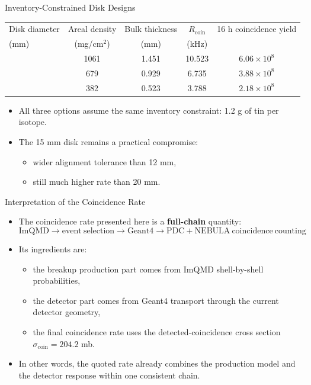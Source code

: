 \documentclass[aspectratio=169]{beamer}
\begin{document}
\begin{frame}{Inventory-Constrained Disk Designs}
\small
\centering
\begin{tabular}{>{\raggedright\arraybackslash}p{1.8cm}cccc}
\toprule
Disk diameter & Areal density & Bulk thickness & $R_{\mathrm{coin}}$ & 16 h coincidence yield \\
(mm) & (mg/cm$^2$) & (mm) & (kHz) &  \\
\midrule
12 & 1061 & 1.451 & 10.523 & $6.06\times 10^8$ \\
15 & 679 & 0.929 & 6.735 & $3.88\times 10^8$ \\
20 & 382 & 0.523 & 3.788 & $2.18\times 10^8$ \\
\bottomrule
\end{tabular}

\vspace{0.3cm}
\begin{itemize}
  \item All three options assume the same inventory constraint: 1.2 g of tin per isotope.
  \item The 15 mm disk remains a practical compromise:
  \begin{itemize}
    \item wider alignment tolerance than 12 mm,
    \item still much higher rate than 20 mm.
  \end{itemize}
\end{itemize}
\end{frame}

\begin{frame}{Interpretation of the Coincidence Rate}
\small
\begin{itemize}
  \item The coincidence rate presented here is a \textbf{full-chain} quantity:
  \[
  \mathrm{ImQMD} \rightarrow \mathrm{event~selection} \rightarrow \mathrm{Geant4} \rightarrow \mathrm{PDC+NEBULA~coincidence~counting}
  \]
  \item Its ingredients are:
  \begin{itemize}
    \item the breakup production part comes from ImQMD shell-by-shell probabilities,
    \item the detector part comes from Geant4 transport through the current detector geometry,
    \item the final coincidence rate uses the detected-coincidence cross section $\sigma_{\mathrm{coin}} = 204.2$ mb.
  \end{itemize}
  \item In other words, the quoted rate already combines the production model and the detector response within one consistent chain.
\end{itemize}
\end{frame}
\end{document}

